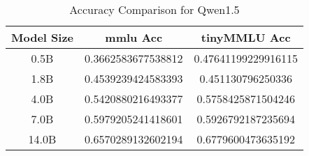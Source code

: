 \begin{table}[h!]
\centering
\begin{tabular}{|c|c|c|}
\hline
Model Size & mmlu Acc & tinyMMLU Acc \\ 
\hline
0.5B & 0.3662583677538812 & 0.47641199229916115 \\ 
\hline
1.8B & 0.4539239424583393 & 0.451130796250336 \\ 
\hline
4.0B & 0.5420880216493377 & 0.5758425871504246 \\ 
\hline
7.0B & 0.5979205241418601 & 0.5926792187235694 \\ 
\hline
14.0B & 0.6570289132602194 & 0.6779600473635192 \\ 
\hline
\end{tabular}
\caption{Accuracy Comparison for Qwen1.5}
\end{table}
